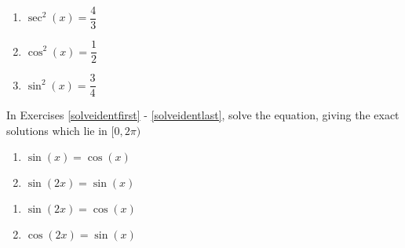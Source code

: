 \begin{multicols}{3}

\begin{enumerate}

\setcounter{enumi}{\value{HW}}

\item $\sec^{2} \left( x \right) = \dfrac{4}{3}$
\item $\cos^{2} \left( x \right) = \dfrac{1}{2}$
\item $\sin^{2} \left( x \right) = \dfrac{3}{4}$ \label{solvebasiclast}

\setcounter{HW}{\value{enumi}}

\end{enumerate}

\end{multicols}

In Exercises \ref{solveidentfirst} - \ref{solveidentlast}, solve the equation, giving the exact solutions which lie in $[0, 2\pi)$


\begin{multicols}{2}

\begin{enumerate}

\setcounter{enumi}{\value{HW}}

\item $\sin \left( x \right) = \cos \left( x \right)$ \label{solveidentfirst}
\item $\sin \left( 2x \right) = \sin \left( x \right)$

\setcounter{HW}{\value{enumi}}

\end{enumerate}

\end{multicols}

\begin{multicols}{2}

\begin{enumerate}

\setcounter{enumi}{\value{HW}}

\item $\sin \left( 2x \right) = \cos \left( x \right)$
\item $\cos \left( 2x \right) = \sin \left( x \right)$

\setcounter{HW}{\value{enumi}}

\end{enumerate}

\end{multicols}


